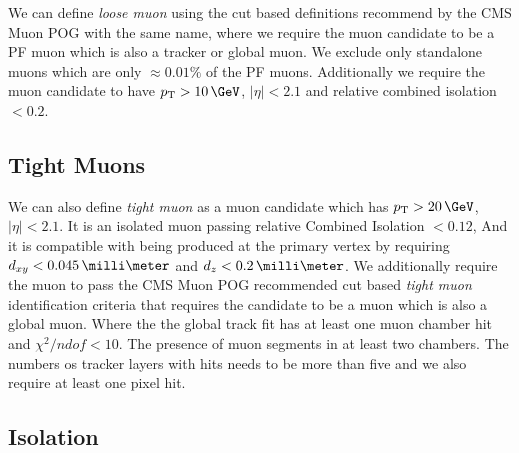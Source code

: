 %

We can define \textit{loose muon} using the cut based definitions recommend by the \gls{CMS} Muon \gls{POG} \cite{ARTICLE:CMSPerformanceOfMuonID7TeV} with the same name, where we require the muon candidate to be a \gls{PF} muon which is also a tracker or global muon. We exclude only standalone muons which are only $\approx 0.01\%$ of the \gls{PF} muons. Additionally we require the muon candidate to have $\pt>10\,\GeV$, $|\eta|<2.1$ and relative combined isolation $<0.2$.

\subsection{Tight Muons}

We can also define \textit{tight muon} as a muon candidate which has $\pt>20\,\GeV$, $|\eta|<2.1$. It is an isolated muon passing relative Combined Isolation $<0.12$, And it is compatible with being produced at the primary vertex by requiring $d_{xy}<0.045\,\milli\meter$ and $d_z < 0.2\,\milli\meter$. We additionally require the muon to pass the  \gls{CMS} Muon \gls{POG} recommended cut based \textit{tight muon} identification criteria that requires the candidate to be a  muon which is also a global muon. Where the the global track fit has at least one muon chamber hit and $\chi^2/ndof < 10$. The presence of muon segments in at least two chambers. The numbers os tracker layers with hits needs to be more than five and we also require at least one pixel hit.

\subsection{Isolation}
\label{SUBSECTION:EventReconstructionAndSimulation_LeptonIsolation_MuonsIsolation}

